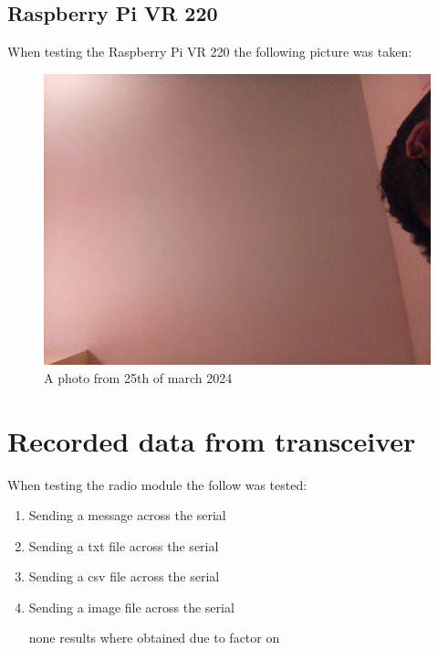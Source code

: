 \subsection{Raspberry Pi VR 220}
When testing  the Raspberry Pi VR 220 the following picture was taken:
\begin{figure}[h!]
    \centering
    \includegraphics[width=0.4\linewidth]{Images/camera_output_2024-03-21_21-43-16.png}
    \caption{A photo from 25th of march 2024 }
    \label{A photo from 25th of march 2024}
\end{figure}

\section{Recorded data from transceiver}
When testing  the radio module the follow was tested:
\begin{enumerate}
    \item Sending a message across the serial

    \item Sending a txt file across the serial

    \item Sending a csv file across the serial

    \item Sending a image file across the serial

    none results where obtained due to  factor on \pageref{Discussion of Lora module}
\end{enumerate}
